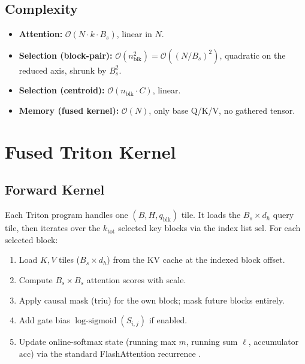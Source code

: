 \documentclass[10pt,letterpaper]{article}
\newcommand{\Ocomplex}{\mathcal{O}}
\newcommand{\LogSigmoid}{\operatorname{log\text{-}sigmoid}}
\begin{document}
\subsection{Complexity}

\begin{itemize}[leftmargin=*,itemsep=1pt]
\item \textbf{Attention:} $\Ocomplex(N \cdot k \cdot B_s)$, linear in $N$.
\item \textbf{Selection (block-pair):} $\Ocomplex(n_{\text{blk}}^2) =
  \Ocomplex((N/B_s)^2)$, quadratic on the reduced axis, shrunk by $B_s^2$.
\item \textbf{Selection (centroid):} $\Ocomplex(n_{\text{blk}} \cdot C)$, linear.
\item \textbf{Memory (fused kernel):} $\Ocomplex(N)$, only base Q/K/V,
  no gathered tensor.
\end{itemize}

\section{Fused Triton Kernel}\label{sec:triton}

\subsection{Forward Kernel}

Each Triton program handles one $(B, H, q_{\text{blk}})$ tile. It loads the
$B_s \times d_h$ query tile, then iterates over the $k_{\text{tot}}$ selected
key blocks via the index list $\text{sel}$. For each selected block:

\begin{enumerate}[leftmargin=*,itemsep=1pt]
\item Load $K, V$ tiles ($B_s \times d_h$) from the KV cache at the indexed
  block offset.
\item Compute $B_s \times B_s$ attention scores with scale.
\item Apply causal mask (triu) for the own block; mask future blocks entirely.
\item Add gate bias $\LogSigmoid(S_{i,j})$ if enabled.
\item Update online-softmax state (running max $m$, running sum $\ell$,
  accumulator $\text{acc}$) via the standard FlashAttention recurrence
  \cite{dao2022flashattention}.
\end{enumerate}
\end{document}
